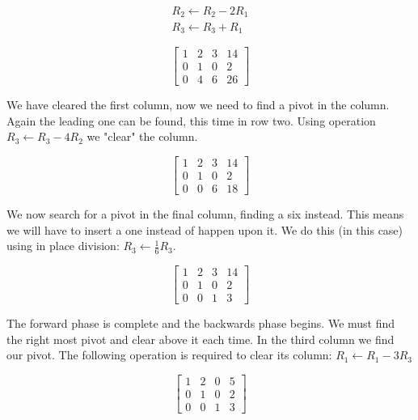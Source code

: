 \documentclass[12pt]{article}
\begin{document}
					\begin{align*}
						R_2 \leftarrow R_2 - 2R_1 \\
						R_3 \leftarrow R_3 + R_1
					\end{align*}

					\begin{equation}
						\left[
						\begin{array}{ccc|c}
							1  & 2 & 3 & 14 \\
							0  & 1 & 0 & 2 \\
							0  & 4 & 6 & 26
						\end{array}
					\right]
					\end{equation}

					We have cleared the first column, now we need to find a pivot in the column.
					Again the leading one can be found,
						this time in row two.
					Using operation $R_3 \leftarrow R_3 - 4R_2$ we "clear" the column.

					\begin{equation}
						\left[
						\begin{array}{ccc|c}
							1  & 2 & 3 & 14 \\
							0  & 1 & 0 & 2 \\
							0  & 0 & 6 & 18
						\end{array}
					\right]
					\end{equation}

					We now search for a pivot in the final column,
						finding a six instead.
					This means we will have to insert a one instead of happen upon it.
					We do this (in this case) using in place division: $R_3 \leftarrow \frac{1}{6} R_3$.

					\begin{equation}
						\left[
						\begin{array}{ccc|c}
							1  & 2 & 3 & 14 \\
							0  & 1 & 0 & 2 \\
							0  & 0 & 1 & 3
						\end{array}
						\right]
					\end{equation}

					The forward phase is complete and the backwards phase begins.
					We must find the right most pivot and clear above it each time.
					In the third column we find our pivot.
					The following operation is required to clear its column: $R_1 \leftarrow R_1 - 3R_3$

					\begin{equation}
						\left[
						\begin{array}{ccc|c}
							1  & 2 & 0 & 5 \\
							0  & 1 & 0 & 2 \\
							0  & 0 & 1 & 3
						\end{array}
						\right]
					\end{equation}
\end{document}
